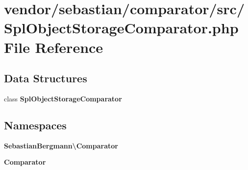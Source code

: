 \section{vendor/sebastian/comparator/src/\+Spl\+Object\+Storage\+Comparator.php File Reference}
\label{_spl_object_storage_comparator_8php}
\subsection*{Data Structures}
\begin{DoxyCompactItemize}
\item 
class {\bf Spl\+Object\+Storage\+Comparator}
\end{DoxyCompactItemize}
\subsection*{Namespaces}
\begin{DoxyCompactItemize}
\item 
 {\bf Sebastian\+Bergmann\textbackslash{}\+Comparator}
\item 
 {\bf Comparator}
\end{DoxyCompactItemize}
